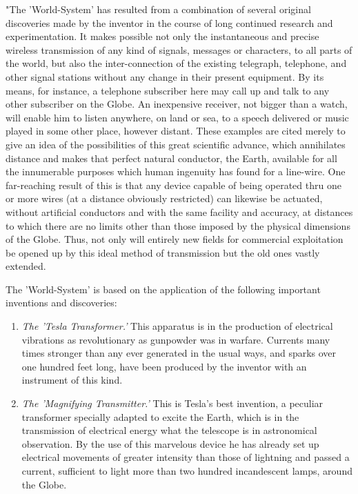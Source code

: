 \documentclass[a4paper,12pt,english,twoside,openright]{memoir}
\begin{document}
{
\small
"The 'World-System' has resulted from a combination of several original 
discoveries made by the 
inventor in the course of long continued research and experimentation.  It makes possible not 
only the instantaneous and precise wireless transmission of any kind of signals, messages or 
characters, to all parts of the world, but also the inter-connection of the existing telegraph, 
telephone, and other signal stations without any change in their present equipment.  By its 
means, for instance, a telephone subscriber here may call up and talk to any other subscriber on 
the Globe.  An inexpensive receiver, not bigger than a watch, will enable him to listen anywhere, 
on land or sea, to a speech delivered or music played in some other place, however distant.  
These examples are cited merely to give an idea of the possibilities of this great scientific 
advance, which annihilates distance and makes that perfect natural conductor, the Earth, 
available for all the innumerable purposes which human ingenuity has found for a line-wire.  One 
far-reaching result of this is that any device capable of being operated thru one or more wires (at 
a distance obviously restricted) can likewise be actuated, without artificial conductors and with the 
same facility and accuracy, at distances to which there are no limits other than those imposed by 
the physical dimensions of the Globe.  Thus, not only will entirely new fields for commercial 
exploitation be opened up by this ideal method of transmission but the old ones vastly extended.  

The 'World-System' is based on the application of the following important inventions and 
discoveries: 
\begin{enumerate}[1.]
\item \emph{The 'Tesla Transformer.'} This apparatus is in the production of electrical vibrations as 
revolutionary as gunpowder was in warfare.  Currents many times stronger than any ever 
generated in the usual ways, and sparks over one hundred feet long, have been produced by the 
inventor with an instrument of this kind.

\item \emph{The 'Magnifying Transmitter.'} This is Tesla's best invention, a peculiar transformer specially 
adapted to excite the Earth, which is in the transmission of electrical energy what the telescope is 
in astronomical observation.  By the use of this marvelous device he has already set up electrical 
movements of greater intensity than those of lightning and passed a current, sufficient to light 
more than two hundred incandescent lamps, around the Globe.


\end{enumerate}}
\end{document}

